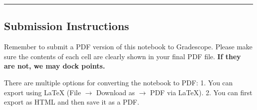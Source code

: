 \documentclass[11pt]{article}
\begin{document}
    \begin{center}\rule{0.5\linewidth}{\linethickness}\end{center}

\hypertarget{submission-instructions}{%
\subsection{Submission Instructions}\label{submission-instructions}}

Remember to submit a PDF version of this notebook to Gradescope. Please
make sure the contents of each cell are clearly shown in your final PDF
file. \textbf{If they are not, we may dock points.}

There are multiple options for converting the notebook to PDF: 1. You
can export using LaTeX (File \(\rightarrow\) Download as \(\rightarrow\)
PDF via LaTeX). 2. You can first export as HTML and then save it as a
PDF.


    
    
    
    
\end{document}

